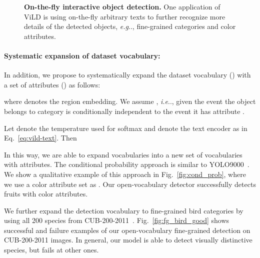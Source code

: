 \documentclass{article} \usepackage{iclr2022_conference,times}
\makeatletter
\DeclareRobustCommand\onedot{\futurelet\@let@token\@onedot}
\def\@onedot{\ifx\@let@token.\else.\null\fi\xspace}
\def\eg{\emph{e.g}\onedot} \def\Eg{\emph{E.g}\onedot}
\def\ie{\emph{i.e}\onedot} \def\Ie{\emph{I.e}\onedot}
\makeatother
\begin{document}
\begin{figure}[h]
\centering
    \hspace{8mm}
    \vspace{-1ex}
    \caption{\textbf{On-the-fly interactive object detection.} 
    One application of ViLD is using on-the-fly arbitrary texts to further recognize more details of the detected objects, \eg, fine-grained categories and color attributes.
    }\label{fig:two_examples}
    \vspace{-2ex}
\end{figure}


\paragraph{Systematic expansion of dataset vocabulary:} In addition, we propose to systematically expand the dataset vocabulary () with a set of attributes () as follows: 

where  denotes the region embedding. We assume , \ie, given  the event the object belongs to category  is conditionally independent to the event it has attribute .

Let  denote the temperature used for softmax and  denote the text encoder as in Eq.~\ref{eq:vild-text}. Then


In this way, we are able to expand  vocabularies into a new set of  vocabularies with attributes. The conditional probability approach is similar to YOLO9000~\citep{yolo9000}.
We show a qualitative example of this approach in Fig.~\ref{fig:cond_prob}, where we use a color attribute set as .
Our open-vocabulary detector successfully detects fruits with color attributes.

We further expand the detection vocabulary to fine-grained bird categories by using all 200 species from CUB-200-2011~\citep{wah2011caltech}.
Fig.~\ref{fig:fg_bird_good} shows successful and failure examples of our open-vocabulary fine-grained detection on CUB-200-2011 images. In general, our model is able to detect visually distinctive species, but fails at other ones.
\end{document}
